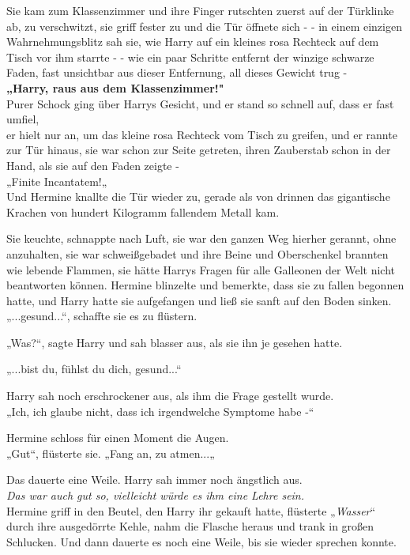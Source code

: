 {Sie kam zum Klassenzimmer und ihre Finger rutschten zuerst auf der Türklinke ab, zu verschwitzt, sie griff fester zu und die Tür öffnete sich - - in einem einzigen Wahrnehmungsblitz sah sie, wie Harry auf ein kleines rosa Rechteck auf dem Tisch vor ihm starrte - - wie ein paar Schritte entfernt der winzige schwarze Faden, fast unsichtbar aus dieser Entfernung, all dieses Gewicht trug -\\ \textbf{„Harry, raus aus dem Klassenzimmer!"}\\ Purer Schock ging über Harrys Gesicht, und er stand so schnell auf, dass er fast umfiel,\\ er hielt nur an, um das kleine rosa Rechteck vom Tisch zu greifen, und er rannte zur Tür hinaus, sie war schon zur Seite getreten, ihren Zauberstab schon in der Hand, als sie auf den Faden zeigte -\\ „Finite Incantatem!„\\ Und Hermine knallte die Tür wieder zu, gerade als von drinnen das gigantische Krachen von hundert Kilogramm fallendem Metall kam.

Sie keuchte, schnappte nach Luft, sie war den ganzen Weg hierher gerannt, ohne anzuhalten, sie war schweißgebadet und ihre Beine und Oberschenkel brannten wie lebende Flammen, sie hätte Harrys Fragen für alle Galleonen der Welt nicht beantworten können. Hermine blinzelte und bemerkte, dass sie zu fallen begonnen hatte, und Harry hatte sie aufgefangen und ließ sie sanft auf den Boden sinken.\\ „...gesund...“, schaffte sie es zu flüstern.

„Was?“, sagte Harry und sah blasser aus, als sie ihn je gesehen hatte.

„...bist du, fühlst du dich, gesund...“

Harry sah noch erschrockener aus, als ihm die Frage gestellt wurde.\\ „Ich, ich glaube nicht, dass ich irgendwelche Symptome habe -“

Hermine schloss für einen Moment die Augen.\\ „Gut“, flüsterte sie. „Fang an, zu atmen...„

Das dauerte eine Weile. Harry sah immer noch ängstlich aus.\\ \emph{Das war auch gut so, vielleicht würde es ihm eine Lehre sein.}\\ Hermine griff in den Beutel, den Harry ihr gekauft hatte, flüsterte „\emph{Wasser}“ durch ihre ausgedörrte Kehle, nahm die Flasche heraus und trank in großen Schlucken. Und dann dauerte es noch eine Weile, bis sie wieder sprechen konnte.

}

